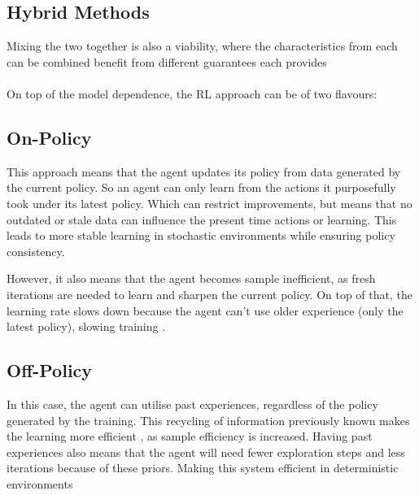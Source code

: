   \subsection{Hybrid Methods}
  Mixing the two together is also a viability, where the characteristics from each can be combined benefit from different guarantees each provides \cite{qu2020combiningmodelbasedmodelfreemethods}
\\\\
  On top of the model dependence, the RL approach can be of two flavours:

  \subsection{On-Policy}
  This approach means that the agent updates its policy from data generated by the current policy. So an agent can only learn from the actions it purposefully took under its latest policy. Which can restrict improvements, but means that no outdated or stale data can influence the present time actions or learning.
  This leads to more stable learning in stochastic environments  while ensuring policy consistency.

  However, it also means that the agent becomes sample inefficient, as fresh iterations are needed to learn and sharpen the current policy. On top of that, the learning rate slows down because the agent can't use older experience (only the latest policy), slowing training \cite{andrychowicz2020onpolicyRL}.

  \subsection{Off-Policy}
  In this case, the agent can utilise past experiences, regardless of the policy generated by the training. This recycling of information previously known makes the learning more efficient \cite{uehara2022reviewoffpolicyevaluationreinforcement}, as sample efficiency is increased.
  Having past experiences also means that the agent will need fewer exploration steps and less iterations because of these priors. Making this system efficient in deterministic environments 
  
